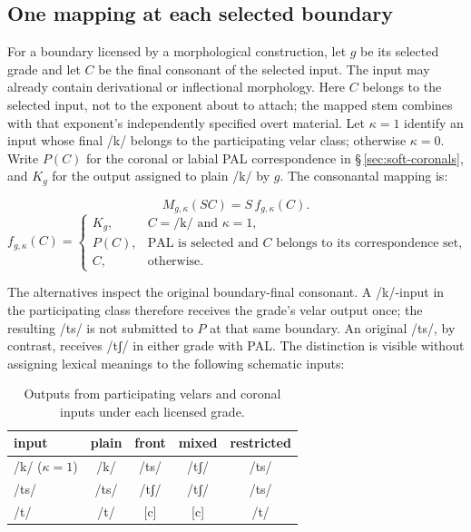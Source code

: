 \subsection{One mapping at each selected boundary}\label{sec:boundary-mapping}

For a boundary licensed by a morphological construction, let \(g\) be its
selected grade and let \(C\) be the final consonant of the selected input.
The input may already contain derivational or inflectional morphology.
Here \(C\) belongs to the selected input, not to the exponent about to
attach; the mapped stem combines with that exponent's independently
specified overt material. Let \(\kappa=1\) identify an input whose final
/k/ belongs to the participating velar class; otherwise \(\kappa=0\).
Write \(P(C)\) for the coronal or labial PAL correspondence in
§\,\ref{sec:soft-coronals}, and \(K_g\) for the output assigned to plain
/k/ by \(g\). The consonantal mapping is:

\[
 M_{g,\kappa}(SC)=S\,f_{g,\kappa}(C).
\]
\[
 f_{g,\kappa}(C)=
 \begin{cases}
 K_g, & C=\text{/k/}\text{ and }\kappa=1,\\
 P(C), & \text{PAL is selected and }C\text{ belongs to its correspondence set},\\
 C, & \text{otherwise}.
 \end{cases}
\]

The alternatives inspect the original boundary-final consonant. A
/k/-input in the participating class therefore receives the grade's velar
output once; the resulting
/ts/ is not submitted to \(P\) at that same boundary. An original /ts/,
by contrast, receives /tʃ/ in either grade with PAL. The distinction is
visible without assigning lexical meanings to the following schematic
inputs:

\begin{table}[ht]
\footnotesize
\caption{Outputs from participating velars and coronal inputs under each licensed grade.}\label{tab:boundary-map}
\begin{tabularx}{0.85\textwidth}{L C C C C}
\toprule
{\sc input} & {\sc plain} & {\sc front} & {\sc mixed} & {\sc restricted} \\
\midrule
/k/ (\(\kappa=1\)) & /k/ & /ts/ & /tʃ/ & /ts/ \\
/ts/ & /ts/ & /tʃ/ & /tʃ/ & /ts/ \\
/t/ & /t/ & [c] & [c] & /t/ \\
\bottomrule
\end{tabularx}
\end{table}

